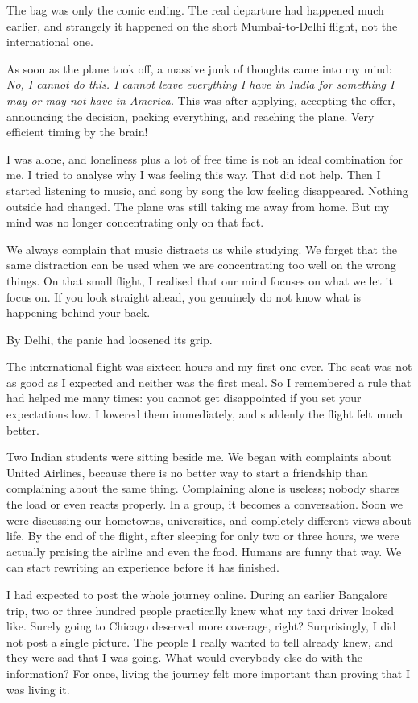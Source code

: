 \documentclass[11pt,twoside,openany]{book}
\newcommand{\scene}{\par\vspace{0.7em}{\centering\color{accent}\rule{0.85cm}{0.6pt}\par}\vspace{0.5em}\noindent\ignorespaces}
\begin{document}
\scene

The bag was only the comic ending. The real departure had happened much
earlier, and strangely it happened on the short Mumbai-to-Delhi flight, not
the international one.

As soon as the plane took off, a massive junk of thoughts came into my mind:
\textit{No, I cannot do this. I cannot leave everything I have in India for
something I may or may not have in America.} This was after applying,
accepting the offer, announcing the decision, packing everything, and reaching
the plane. Very efficient timing by the brain!

I was alone, and loneliness plus a lot of free time is not an ideal
combination for me. I tried to analyse why I was feeling this way. That did
not help. Then I started listening to music, and song by song the low feeling
disappeared. Nothing outside had changed. The plane was still taking me away
from home. But my mind was no longer concentrating only on that fact.

We always complain that music distracts us while studying. We forget that the
same distraction can be used when we are concentrating too well on the wrong
things. On that small flight, I realised that our mind focuses on what we let
it focus on. If you look straight ahead, you genuinely do not know what is
happening behind your back.

By Delhi, the panic had loosened its grip.

The international flight was sixteen hours and my first one ever. The seat
was not as good as I expected and neither was the first meal. So I remembered
a rule that had helped me many times: you cannot get disappointed if you set
your expectations low. I lowered them immediately, and suddenly the flight
felt much better.

Two Indian students were sitting beside me. We began with complaints about
United Airlines, because there is no better way to start a friendship than
complaining about the same thing. Complaining alone is useless; nobody shares
the load or even reacts properly. In a group, it becomes a conversation. Soon
we were discussing our hometowns, universities, and completely different
views about life. By the end of the flight, after sleeping for only two or
three hours, we were actually praising the airline and even the food. Humans
are funny that way. We can start rewriting an experience before it has
finished.

\scene

I had expected to post the whole journey online. During an earlier Bangalore
trip, two or three hundred people practically knew what my taxi driver looked
like. Surely going to Chicago deserved more coverage, right? Surprisingly, I
did not post a single picture. The people I really wanted to tell already
knew, and they were sad that I was going. What would everybody else do with
the information? For once, living the journey felt more important than proving
that I was living it.
\end{document}
